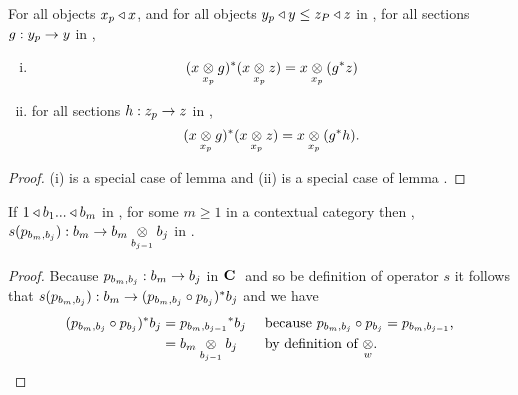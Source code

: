 
\vspace{0.15cm}
\begin{lemma}
For all objects $x_p \base x$, and for all objects $y_p \base y \leq z_P \base z$ in \catc, 
for all sections $g:y_p \morph y$ in \catc, 
\begin{enumerate}[(i)]
\item
\begin{equation*}
\label{metagatcrossstarcross}
(\crossx{x}{g}{x_p})^*(\crossx{x}{z}{x_p})=\crossx{x}{(g^*z)}{x_p}
\end{equation*}
\item for all sections $h:z_p \morph z$ in \catc,
\begin{equation*}
\label{metagatcrossstarcrosssection}
(\crossx{x}{g}{x_p})^*(\crossx{x}{z}{x_p})=\crossx{x}{(g^*h)}{x_p}.
\end{equation*}
\end{enumerate}
\end{lemma}
\begin{proof}
(i) is a special case of lemma 
and
(ii) is a special case of lemma .
\end{proof}
\begin{lemma}
If $1 \base b_1 ... \base b_m$ in \catc, for some $m \ge 1$ in a contextual category \catcw then \foreachj,
$s(p_{b_m,b_j}): b_m \morph \crossx{b_m}{b_j}{b_{j-1}}$ in \catcw.
\end{lemma}
\begin{proof}
Because $p_{b_m,b_j}: b_m \morph b_j$ in $\catcw$ and so be definition of operator $s$ it follows that $s(p_{b_m,b_j}): b_m  \morph (p_{b_m,b_j} \circ p_{b_j})^*b_j$
and we have 
\begin{align*}
(p_{b_m,b_j} \circ p_{b_j})^*b_j &= {p_{b_m,b_{j-1}}} ^* b_j  && \mbox{ because $p_{b_m,b_j} \circ p_{b_j}=p_{b_m,b_{j-1}}$,} \\
                                 &= \crossx{b_m}{b_j}{b_{j-1}} && \mbox{ by definition of $\crossx{}{}{w}$}.
\end{align*}
\end{proof}
